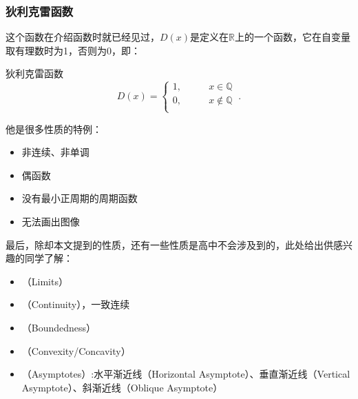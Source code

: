 \subsubsection{狄利克雷函数}

这个函数在介绍函数时就已经见过，$D(x)$是定义在$\mathbb{R}$上的一个函数，它在自变量取有理数时为1，否则为0，即：
\begin{definition}{狄利克雷函数}
\begin{equation}
D(x)=\begin{cases}
1,\qquad& x\in\mathbb{Q} \\
0,\qquad& x\notin\mathbb{Q}  \\
\end{cases} ~.
\end{equation}
\end{definition}

他是很多性质的特例：
\begin{itemize}
\item 非连续、非单调
\item 偶函数
\item 没有最小正周期的周期函数
\item 无法画出图像
\end{itemize}

最后，除却本文提到的性质，还有一些性质是高中不会涉及到的，此处给出供感兴趣的同学了解：
\begin{itemize}
\item {}（Limits）
\item {}（Continuity），一致连续
\item {}（Boundedness）
\item {}（Convexity/Concavity）
\item {}（Asymptotes）:水平渐近线（Horizontal Asymptote）、垂直渐近线（Vertical Asymptote）、斜渐近线（Oblique Asymptote）
\end{itemize}